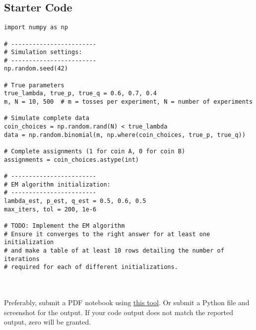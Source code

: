 \documentclass{article}
\begin{document}
\subsection*{Starter Code}
\begin{verbatim}
import numpy as np

# ------------------------
# Simulation settings:
# ------------------------
np.random.seed(42)

# True parameters
true_lambda, true_p, true_q = 0.6, 0.7, 0.4
m, N = 10, 500  # m = tosses per experiment, N = number of experiments

# Simulate complete data
coin_choices = np.random.rand(N) < true_lambda
data = np.random.binomial(m, np.where(coin_choices, true_p, true_q))

# Complete assignments (1 for coin A, 0 for coin B)
assignments = coin_choices.astype(int)

# ------------------------
# EM algorithm initialization:
# ------------------------
lambda_est, p_est, q_est = 0.5, 0.6, 0.5
max_iters, tol = 200, 1e-6

# TODO: Implement the EM algorithm
# Ensure it converges to the right answer for at least one initialization 
# and make a table of at least 10 rows detailing the number of iterations 
# required for each of different initializations.
\end{verbatim}
\\
\\
Preferably, submit a PDF notebook using \hyperlink{https://htmtopdf.herokuapp.com/ipynbviewer/#google_vignette}{this tool}. Or submit a Python file and screenshot for the output. If your code output does not match the reported output, zero will be granted.
\end{document}
